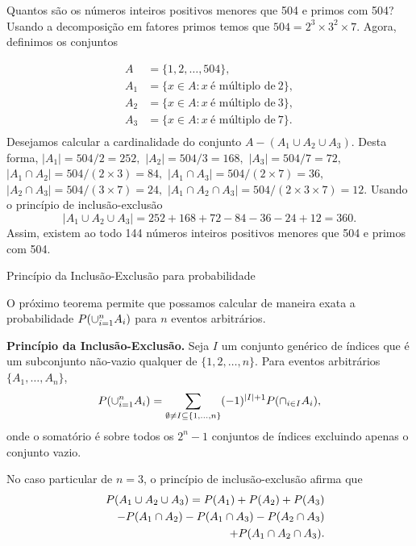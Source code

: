 \begin{frame}
\begin{exem}
Quantos são os números inteiros positivos menores que 504 e primos com 504? 
Usando a decomposição em fatores primos temos que $504 = 2^3 \times 3^2 \times 7.$ Agora, definimos os conjuntos 

$$
\begin{aligned}
A & = \{1, 2, \ldots , 504\},\\
A_1 &= \{x \in A : x \ \text{é múltiplo de} \ 2\},\\
A_2 &= \{x \in A : x \ \text{é múltiplo de} \ 3\}, \\
A_3 &= \{x \in A : x \ \text{é múltiplo de} \ 7\}. \\
\end{aligned}
$$
Desejamos calcular a cardinalidade do conjunto $A - (A_1 \cup A_2 \cup A_3 )$. Desta forma, 
$|A_1|= 504/2 = 252,$
$|A_2|= 504/3 = 168,$ 
$|A_3|= 504/7 = 72,$ 
$|A_1 \cap A_2 | = 504/ (2\times 3) = 84,$ 
$|A_1 \cap A_3| = 504/  (2\times 7) = 36,$ 
$|A_2 \cap A_3 | = 504/ (3\times 7)=  24,$  
$|A_1 \cap A_2 \cap A_3 | = 504/ (2\times 3\times 7)=  12. $ 
Usando o princípio de inclusão-exclusão
$$|A_1 \cup A_2 \cup A_3 | = 252 + 168 + 72 - 84 - 36 - 24 + 12 = 360.$$
Assim, existem ao todo 144 números inteiros positivos menores que 504 e primos com 504.
\end{exem}
\end{frame}



\begin{frame}{Princípio da Inclusão-Exclusão para probabilidade}
	
	O próximo teorema permite que possamos calcular de maneira exata a
	probabilidade $P(\cup_{i=1}^{n}A_i)$ para $n$ eventos arbitrários.
	
	\begin{teo} {\bf Princípio da Inclusão-Exclusão.}  Seja $I$ um conjunto
	genérico de índices que é um subconjunto não-vazio qualquer de
	$\{1,2,\ldots,n\}$. Para eventos arbitrários $\{A_1,\ldots,A_n\}$,
	$$P(\cup_{i=1}^{n}A_i)=\sum_{\emptyset\ne I\subseteq \{1,\ldots, n\}}(-1)^{|I|+1}P(\cap_{i\in I}A_i),$$
	onde o somatório é sobre todos os $2^n-1$ conjuntos de índices
	excluindo apenas o conjunto vazio. \end{teo}
	
	No caso particular de $n=3$, o princípio de inclusão-exclusão afirma
	que
	\begin{eqnarray}
	& & P(A_1\cup A_2\cup A_3)=P(A_1)+P(A_2)+P(A_3)\nonumber\\
	& & -P(A_1\cap A_2)-P(A_1\cap A_3)-P(A_2\cap A_3)\nonumber\\
	& & +P(A_1\cap A_2\cap A_3).\nonumber
	\end{eqnarray}
	
\end{frame}

